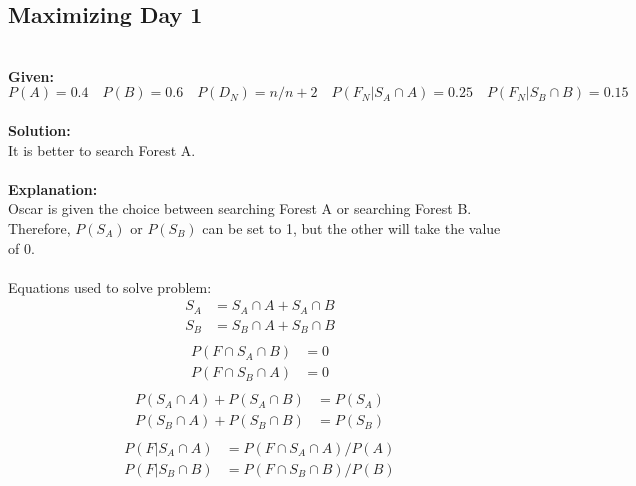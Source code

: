 \subsection{Maximizing Day 1}
 \\
{\bf Given:}\\    
    $ P(A) = 0.4 \quad P(B) = 0.6 \quad P(D_N) = n/n+2 \quad P(F_{N}|S_A \cap A) = 0.25 \quad P(F_{N}|S_B \cap B) = 0.15 $\\ \\
{\bf Solution:}\\
    {\color{blue}It is better to search Forest A.}\\ \\
{\bf Explanation:}\\
    Oscar is given the choice between searching Forest A or searching Forest B. Therefore, $P(S_A)$ or $P(S_B)$ can be set to 1, but the other will take the value of 0. \\\\
    Equations used to solve problem: \\
    \begin{equation} \label{eq1}
        \begin{split}
            S_A &= S_A \cap A + S_A \cap B \\
            S_B &= S_B \cap A + S_B \cap B \\
        \end{split}
    \end{equation}
    \begin{equation} \label{eq2}
        \begin{split}
            P(F \cap S_{A}\cap B) &= 0 \\
            P(F \cap S_{B}\cap A) &= 0 \\
        \end{split}
    \end{equation}
    \begin{equation} \label{eq3}
        \begin{split}
            P(S_A \cap A) + P(S_A \cap B) &= P(S_A) \\
            P(S_B \cap A) + P(S_B \cap B) &= P(S_B) \\
        \end{split}
    \end{equation}
    \begin{equation} \label{eq4}
        \begin{split}
            P(F|S_A \cap A) &= P(F \cap S_A \cap A)\slash P(A) \\
            P(F|S_B \cap B) &= P(F \cap S_B \cap B)\slash P(B) \\
        \end{split}
    \end{equation}
